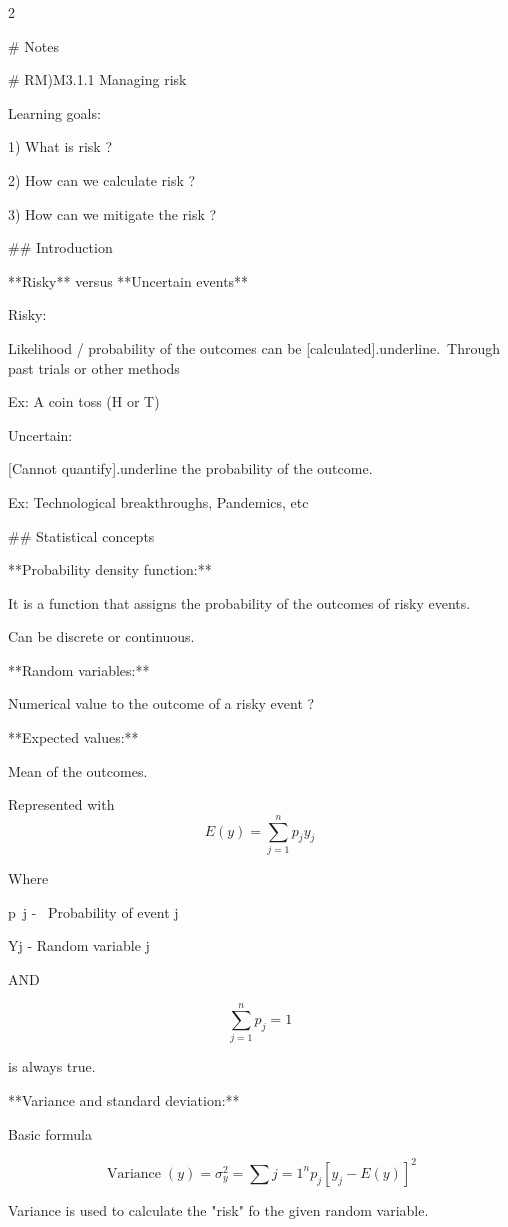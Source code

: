 \documentclass{article}
\begin{document}
\begin{multicols}{2}


    
# Notes

# RM)M3.1.1 Managing risk

Learning goals:

1)  What is risk ?

2)  How can we calculate risk ?

3)  How can we mitigate the risk ?

## Introduction

**Risky** versus **Uncertain events**

Risky:

Likelihood / probability of the outcomes can be [calculated]{.underline}.\
Through past trials or other methods

Ex: A coin toss (H or T)

Uncertain:

[Cannot quantify]{.underline} the probability of the outcome.

Ex: Technological breakthroughs, Pandemics, etc

## Statistical concepts

**Probability density function:**

It is a function that assigns the probability of the outcomes of risky events.

Can be discrete or continuous.

**Random variables:**

Numerical value to the outcome of a risky event ?

\newpage

**Expected values:**

Mean of the outcomes.

Represented with$$
E(y)=\sum_{j=1}^n p_j y_j 
$$

Where

\space p~j -~ Probability of event j

\space Yj - Random variable j

AND

$$
\sum_{j=1}^n p_j = 1$$

is always true.

**Variance and standard deviation:**

Basic formula

$$
\operatorname{Variance}(y)=\sigma_y^2=\sum{j=1}^n p_j\left[y_j-E(y)\right]^2
$$

Variance is used to calculate the "risk" fo the given random variable.


\end{multicols}
\end{document}
